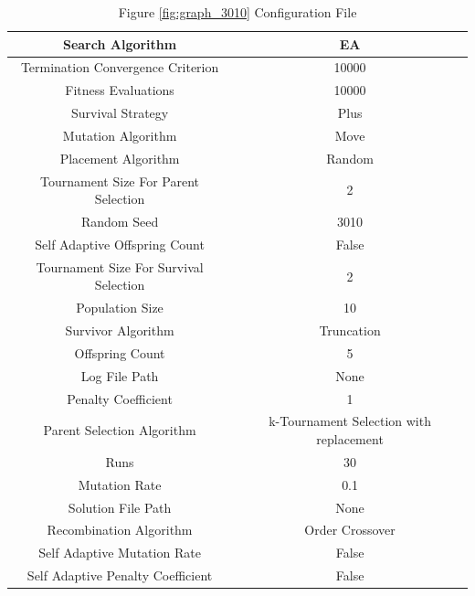 \documentclass{standalone}
\begin{document}
\begin{table}[!htb]
	\centering
	\caption{Figure \ref{fig:graph_3010} Configuration File}
	\label{tab:graph_3010}
	\begin{tabular}{| c | c |}
		\hline
		Search Algorithm		& EA		 \\
		\hline
		Termination Convergence Criterion		& 10000		 \\
		\hline
		Fitness Evaluations		& 10000		 \\
		\hline
		Survival Strategy		& Plus		 \\
		\hline
		Mutation Algorithm		& Move		 \\
		\hline
		Placement Algorithm		& Random		 \\
		\hline
		Tournament Size For Parent Selection		& 2		 \\
		\hline
		Random Seed		& 3010		 \\
		\hline
		Self Adaptive Offspring Count		& False		 \\
		\hline
		Tournament Size For Survival Selection		& 2		 \\
		\hline
		Population Size		& 10		 \\
		\hline
		Survivor Algorithm		& Truncation		 \\
		\hline
		Offspring Count		& 5		 \\
		\hline
		Log File Path		& None		 \\
		\hline
		Penalty Coefficient		& 1		 \\
		\hline
		Parent Selection Algorithm		& k-Tournament Selection with replacement		 \\
		\hline
		Runs		& 30		 \\
		\hline
		Mutation Rate		& 0.1		 \\
		\hline
		Solution File Path		& None		 \\
		\hline
		Recombination Algorithm		& Order Crossover		 \\
		\hline
		Self Adaptive Mutation Rate		& False		 \\
		\hline
		Self Adaptive Penalty Coefficient		& False		 \\
		\hline
	\end{tabular}
\end{table}
\end{document}
